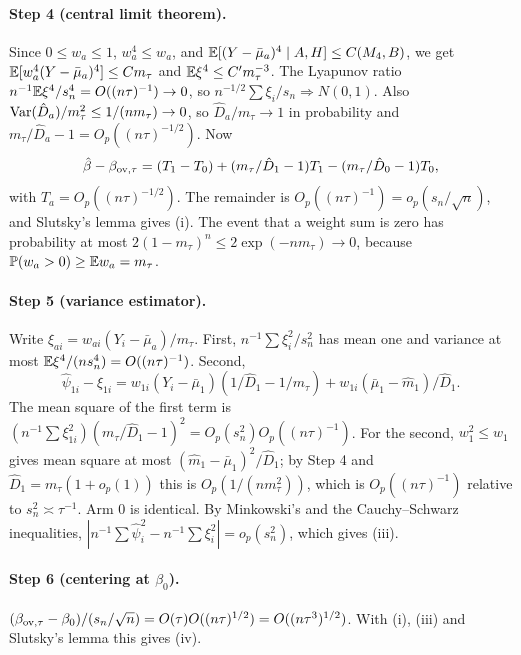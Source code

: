 \paragraph{Step 4 (central limit theorem).} Since $0\le w_a\le1$, $w_a^4\le
w_a$, and $\mathbb{E}[(Y-\bar\mu_a)^4\mid A,H]\le C(M_4,B)$, we get
$\mathbb{E}[w_a^4(Y-\bar\mu_a)^4]\le Cm_\tau$ and $\mathbb{E}\xi^4\le C'm_\tau^{-3}$. The
Lyapunov ratio $n^{-1}\mathbb{E}\xi^4/s_n^4=O((n\tau)^{-1})\to0$, so
$n^{-1/2}\sum\xi_i/s_n\Rightarrow N(0,1)$. Also
$\mathrm{Var}(\hat D_a)/m_\tau^2\le1/(nm_\tau)\to0$, so $\hat D_a/m_\tau\to1$ in
probability and $m_\tau/\hat D_a-1=O_p((n\tau)^{-1/2})$. Now
\begin{equation}\label{eq:decomp}
\hat\beta-\beta_{\mathrm{ov},\tau}=(T_1-T_0)+(m_\tau/\hat D_1-1)T_1-(m_\tau/\hat D_0-1)T_0,
\end{equation}
with $T_a=O_p((n\tau)^{-1/2})$. The remainder is
$O_p((n\tau)^{-1})=o_p(s_n/\sqrt n)$, and Slutsky's lemma gives (i). The event
that a weight sum is zero has probability at most
$2(1-m_\tau)^n\le2\exp(-nm_\tau)\to0$, because $\mathbb{P}(w_{a}>0)\ge\mathbb{E} w_a=m_\tau$.

\paragraph{Step 5 (variance estimator).} Write
$\xi_{ai}=w_{ai}(Y_i-\bar\mu_a)/m_\tau$. First, $n^{-1}\sum\xi_i^2/s_n^2$ has
mean one and variance at most $\mathbb{E}\xi^4/(ns_n^4)=O((n\tau)^{-1})$. Second,
\[
\hat\psi_{1i}-\xi_{1i}=w_{1i}(Y_i-\bar\mu_1)(1/\hat D_1-1/m_\tau)+w_{1i}(\bar\mu_1-\hat m_1)/\hat D_1 .
\]
The mean square of the first term is
$(n^{-1}\sum\xi_{1i}^2)(m_\tau/\hat D_1-1)^2=O_p(s_n^2)O_p((n\tau)^{-1})$.
For the second, $w_1^2\le w_1$ gives mean square at most
$(\hat m_1-\bar\mu_1)^2/\hat D_1$; by Step 4 and $\hat D_1=m_\tau(1+o_p(1))$
this is $O_p(1/(nm_\tau^2))$, which is $O_p((n\tau)^{-1})$ relative to
$s_n^2\asymp\tau^{-1}$. Arm $0$ is identical. By Minkowski's and the
Cauchy--Schwarz inequalities, $|n^{-1}\sum\hat\psi_i^2-n^{-1}\sum\xi_i^2|=o_p(s_n^2)$,
which gives (iii).

\paragraph{Step 6 (centering at $\beta_0$).}
$(\beta_{\mathrm{ov},\tau}-\beta_0)/(s_n/\sqrt n)=O(\tau)O((n\tau)^{1/2})=O((n\tau^3)^{1/2})$.
With (i), (iii) and Slutsky's lemma this gives (iv).


